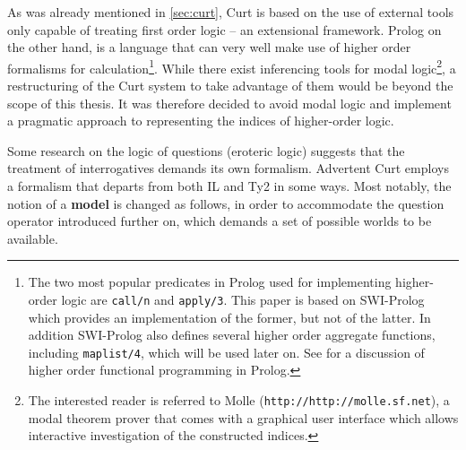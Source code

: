 \documentclass[11pt,a4paper]{article}
\newcommand{\abbr}{\textsf} %
\newcommand{\term}[1]{\textsf{\textbf{#1}}} %
\newcommand{\code}{\texttt} %
\newcommand{\pn}{\textsf} %
\newcommand{\url}[1]{\code{http://#1}} %
\newcommand{\curt}{\pn{Curt}}
\newcommand{\acurt}{\pn{Advertent Curt}}
\newcommand{\prol}{\pn{Prolog}}
\theoremstyle{remark}
\theoremstyle{remark}
\theoremstyle{definition}
\begin{document}
As was already mentioned in \ref{sec:curt}, \curt{} is based on 
the use of external tools only capable of treating first order logic – an
extensional framework. \prol{} on the other hand, is a language that can very well
make use of higher order formalisms for calculation\footnote{The two most
popular predicates in \prol{} used for implementing higher-order logic are
\code{call/n} and \code{apply/3}. This paper is based on \pn{SWI-Prolog} which
provides an implementation of the former, but not of the latter. In addition
\pn{SWI-Prolog} also defines several higher order aggregate functions, including
\code{maplist/4}, which will be used later on. See \cite{naish:prolhio} for a
discussion of higher order functional programming in \prol.}.  While there exist
inferencing tools for modal logic\footnote{ The interested reader is referred to
\pn{Molle} (\url{http://molle.sf.net}), a modal theorem prover that comes with a
graphical user interface which allows interactive investigation of the
constructed indices.}, a restructuring of the \curt{} system to take advantage
of them would be beyond the scope of this thesis.  It was therefore decided to
avoid modal logic and implement a pragmatic approach to representing the indices
of higher-order logic.

Some research on the logic of questions (eroteric logic) suggests that the
treatment of interrogatives demands its own formalism.  \acurt{} employs a
formalism that departs from both \abbr{IL} and \abbr{Ty2} in some ways. Most
notably, the notion of a \term{model} is changed as follows, in order to
accommodate the question operator introduced further on, which demands a set of
possible worlds to be available.
\end{document}
